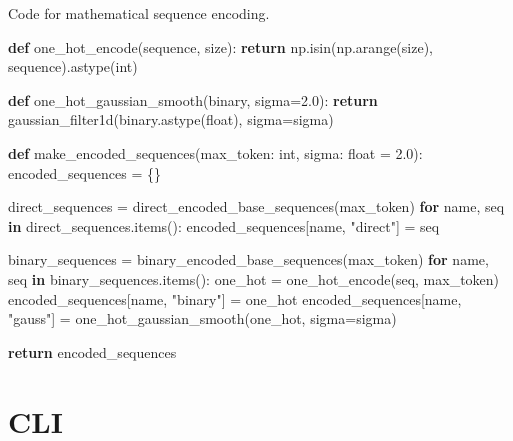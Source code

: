 \documentclass[
  a4paper, twoside, 10pt, titlepage]{book}
\newenvironment{Shaded}{}{}
\newcommand{\BuiltInTok}[1]{\textcolor[rgb]{0.00,0.50,0.00}{#1}}
\newcommand{\ControlFlowTok}[1]{\textcolor[rgb]{0.00,0.44,0.13}{\textbf{#1}}}
\newcommand{\FloatTok}[1]{\textcolor[rgb]{0.25,0.63,0.44}{#1}}
\newcommand{\KeywordTok}[1]{\textcolor[rgb]{0.00,0.44,0.13}{\textbf{#1}}}
\newcommand{\NormalTok}[1]{#1}
\newcommand{\OperatorTok}[1]{\textcolor[rgb]{0.40,0.40,0.40}{#1}}
\newcommand{\StringTok}[1]{\textcolor[rgb]{0.25,0.44,0.63}{#1}}
\begin{document}
\begin{codelisting}

\caption{Code for mathematical sequence
encoding.}\label{lst:mathencoding}

\begin{Shaded}
\begin{Highlighting}[]
\KeywordTok{def}\NormalTok{ one\_hot\_encode(sequence, size):}
    \ControlFlowTok{return}\NormalTok{ np.isin(np.arange(size), sequence).astype(}\BuiltInTok{int}\NormalTok{)}

\KeywordTok{def}\NormalTok{ one\_hot\_gaussian\_smooth(binary, sigma}\OperatorTok{=}\FloatTok{2.0}\NormalTok{):}
    \ControlFlowTok{return}\NormalTok{ gaussian\_filter1d(binary.astype(}\BuiltInTok{float}\NormalTok{), sigma}\OperatorTok{=}\NormalTok{sigma)}

\KeywordTok{def}\NormalTok{ make\_encoded\_sequences(max\_token: }\BuiltInTok{int}\NormalTok{, sigma: }\BuiltInTok{float} \OperatorTok{=} \FloatTok{2.0}\NormalTok{):}
\NormalTok{    encoded\_sequences }\OperatorTok{=}\NormalTok{ \{\}}

\NormalTok{    direct\_sequences }\OperatorTok{=}\NormalTok{ direct\_encoded\_base\_sequences(max\_token)}
    \ControlFlowTok{for}\NormalTok{ name, seq }\KeywordTok{in}\NormalTok{ direct\_sequences.items():}
\NormalTok{        encoded\_sequences[name, }\StringTok{"direct"}\NormalTok{] }\OperatorTok{=}\NormalTok{ seq}

\NormalTok{    binary\_sequences }\OperatorTok{=}\NormalTok{ binary\_encoded\_base\_sequences(max\_token)}
    \ControlFlowTok{for}\NormalTok{ name, seq }\KeywordTok{in}\NormalTok{ binary\_sequences.items():}
\NormalTok{        one\_hot }\OperatorTok{=}\NormalTok{ one\_hot\_encode(seq, max\_token)}
\NormalTok{        encoded\_sequences[name, }\StringTok{"binary"}\NormalTok{] }\OperatorTok{=}\NormalTok{ one\_hot}
\NormalTok{        encoded\_sequences[name, }\StringTok{"gauss"}\NormalTok{] }\OperatorTok{=}\NormalTok{ one\_hot\_gaussian\_smooth(one\_hot, sigma}\OperatorTok{=}\NormalTok{sigma)}

    \ControlFlowTok{return}\NormalTok{ encoded\_sequences}
\end{Highlighting}
\end{Shaded}

\end{codelisting}

\section{CLI}\label{cli}
\end{document}
